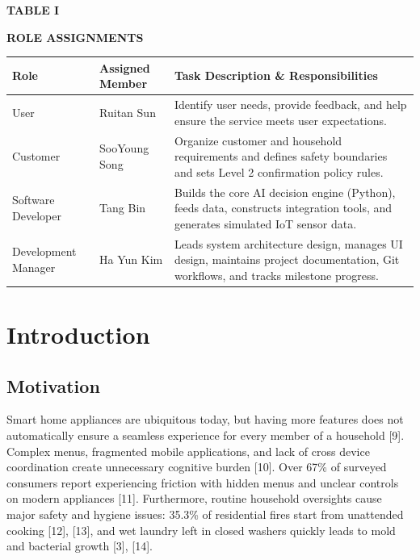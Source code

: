 \documentclass[conference]{IEEEtran}
\begin{document}
\begin{center}
\centering
\footnotesize
{\scshape\bfseries TABLE I\par}
{\scshape\bfseries ROLE ASSIGNMENTS\par}
\vspace{2pt}
\begin{tabular}{@{}>{\raggedright\arraybackslash}p{}
>{\raggedright\arraybackslash}p{}
>{\raggedright\arraybackslash}p{}@{}}
\hline
\textbf{Role} & \textbf{Assigned Member} & \textbf{Task Description \& Responsibilities} \\
\hline
User & Ruitan Sun & Identify user needs, provide feedback, and help ensure the service meets user expectations. \\
Customer & SooYoung Song & Organize customer and household requirements and defines safety boundaries and sets Level 2 confirmation policy rules. \\
Software Developer & Tang Bin & Builds the core AI decision engine (Python), feeds data, constructs integration tools, and generates simulated IoT sensor data. \\
Development Manager & Ha Yun Kim & Leads system architecture design, manages UI design, maintains project documentation, Git workflows, and tracks milestone progress. \\
\hline
\end{tabular}
\end{center}

\section{Introduction}

\subsection{Motivation}
Smart home appliances are ubiquitous today, but having more features does not
automatically ensure a seamless experience for every member of a household [9].
Complex menus, fragmented mobile applications, and lack of cross device
coordination create unnecessary cognitive burden [10]. Over 67\% of surveyed
consumers report experiencing friction with hidden menus and unclear controls on
modern appliances [11]. Furthermore, routine household oversights cause major
safety and hygiene issues: 35.3\% of residential fires start from unattended
cooking [12], [13], and wet laundry left in closed washers quickly leads to mold
and bacterial growth [3], [14].
\end{document}

